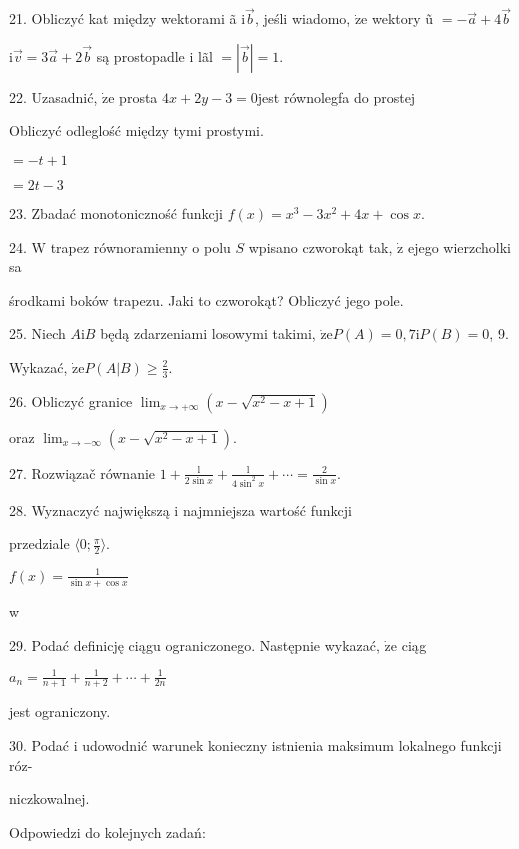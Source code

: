 \documentclass[a4paper,12pt]{article}
\begin{document}
21. Obliczyć kat między wektorami ã $\mathrm{i}\vec{b}$, jeśli wiadomo, $\dot{\mathrm{z}}\mathrm{e}$ wektory ũ $= -\vec{a}+4\vec{b}$

$\mathrm{i}\vec{v}=3\vec{a}+2\vec{b}$ są prostopadle i lãl $=|\vec{b}|=1.$

22. Uzasadnić, $\dot{\mathrm{z}}\mathrm{e}$ prosta $4x+2y-3=0$jest równolegfa do prostej 

Obliczyć odleglość między tymi prostymi.

$= -t+1$

$= 2t-3$

23. Zbadać monotoniczność funkcji $f(x)=x^{3}-3x^{2}+4x+\cos x.$

24. $\mathrm{W}$ trapez równoramienny o polu $S$ wpisano czworokąt tak, $\dot{\mathrm{z}}$ ejego wierzcholki sa

środkami boków trapezu. Jaki to czworokąt? Obliczyć jego pole.

25. Niech $A\mathrm{i}B$ będą zdarzeniami losowymi takimi, $\dot{\mathrm{z}}\mathrm{e}P(A) =0, 7\mathrm{i}P(B) =0$, 9.

Wykazać, $\displaystyle \dot{\mathrm{z}}\mathrm{e}P(A|B)\geq\frac{2}{3}.$

26. Obliczyć granice $\displaystyle \lim_{x\rightarrow+\infty}(x-\sqrt{x^{2}-x+1})$

oraz $\displaystyle \lim_{x\rightarrow-\infty}(x-\sqrt{x^{2}-x+1}).$

27. Rozwiązač równanie $1+\displaystyle \frac{\mathrm{l}}{2\sin x}+\frac{\mathrm{l}}{4\sin^{2}x}+\cdots=\frac{2}{\sin x}.$

28. Wyznaczyć największą i najmniejsza wartość funkcji

przedziale $\displaystyle \langle 0;\frac{\pi}{2}\rangle.$

$f(x) = \displaystyle \frac{1}{\sin x+\cos x}$

w

29. Podać definicję ciągu ograniczonego. Następnie wykazać, $\dot{\mathrm{z}}\mathrm{e}$ ciąg

$a_{n}=\displaystyle \frac{1}{n+1}+\frac{1}{n+2}+\cdots+\frac{1}{2n}$

jest ograniczony.

30. Podać i udowodnić warunek konieczny istnienia maksimum lokalnego funkcji róz-

niczkowalnej.





Odpowiedzi do kolejnych zadań:
\end{document}
